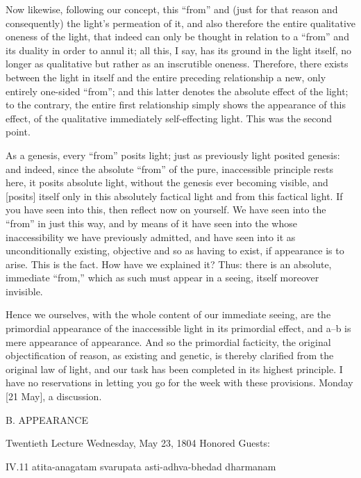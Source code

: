 Now likewise, following our concept,
this “from” and (just for that reason and consequently)
the light's permeation of it,
and also therefore the entire
qualitative oneness of the light,
that indeed can only be thought in relation to
a “from” and its duality in order to annul it;
all this, I say, has its ground in the light itself,
no longer as qualitative but rather as an inscrutible oneness.
Therefore, there exists between the light in itself and
the entire preceding relationship
a new, only entirely one-sided “from”;
and this latter denotes the absolute effect of the light;
to the contrary, the entire first relationship simply shows
the appearance of this effect,
of the qualitative immediately self-effecting light.
This was the second point.

As a genesis, every “from” posits light;
just as previously light posited genesis:
and indeed, since the absolute “from” of
the pure, inaccessible principle rests here,
it posits absolute light,
without the genesis ever becoming visible,
and [posits] itself only
in this absolutely factical light
and from this factical light.
If you have seen into this,
then reflect now on yourself.
We have seen into the “from” in just this way,
and by means of it have seen into the
whose inaccessibility we have previously admitted,
and have seen into it as unconditionally existing,
objective and so as having to exist,
if appearance is to arise.
This is the fact.
How have we explained it?
Thus: there is an absolute, immediate “from,”
which as such must appear in a seeing,
itself moreover invisible.

Hence we ourselves,
with the whole content
of our immediate seeing,
are the primordial appearance
of the inaccessible light
in its primordial effect,
and a–b is mere appearance of appearance.
And so the primordial facticity,
the original objectification of reason,
as existing and genetic, is thereby clarified
from the original law of light,
and our task has been completed
in its highest principle.
I have no reservations in letting you go
for the week with these provisions.
Monday [21 May], a discussion.

B. APPEARANCE

Twentieth Lecture
Wednesday, May 23, 1804
Honored Guests:

IV.11
atita-anagatam svarupata asti-adhva-bhedad dharmanam


